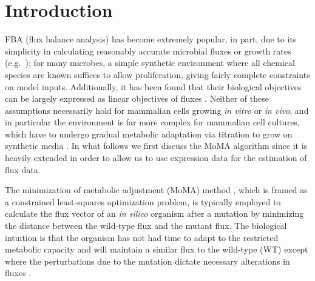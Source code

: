 \section{Introduction}

%
%
FBA (flux balance analysis) has become extremely popular, in part, due
to its simplicity in calculating reasonably accurate microbial fluxes
or growth rates (e.g.\ \citealt{Schuetz2012,Fong2004_sb2013}); for
many microbes, a simple synthetic environment where all chemical
species are known suffices to allow proliferation, giving fairly
complete constraints on model inputs. Additionally, it has been found
that their biological objectives can be largely expressed as linear
objectives of fluxes \citep{Schuetz2012}.  Neither of these
assumptions necessarily hold for mammalian cells growing \textit{in
  vitro} or \textit{in vivo}, and in particular the environment is far
more complex for mammalian cell cultures, which have to undergo
gradual metabolic adaptation via titration to grow on synthetic media
\citep{Pirkmajer2011}. In what follows we first discuss the MoMA
algorithm since it is heavily extended in order to allow us to use
expression data for the estimation of flux data.


The minimization of metabolic adjustment (MoMA) method
\citep{Segre2002}, which is framed as a constrained least-squares optimization
problem, is typically employed to calculate the flux vector of an
\textit{in silico} organism after a mutation by minimizing the distance
between the wild-type flux and the mutant flux. The biological
intuition is that the organism has not had time to adapt to the
restricted metabolic capacity and will maintain a similar flux to the
wild-type (WT) except where the perturbations due to the mutation
dictate necessary alterations in fluxes \citep{Shlomi2005}.

